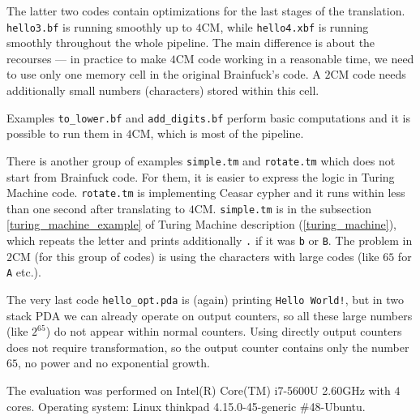 \documentclass[english,shortabstract,mgr]{iithesis}
\begin{document}
The latter two codes contain optimizations for the last stages of the translation. \texttt{hello3.bf}
is running smoothly up to $4$CM, while \texttt{hello4.xbf} is running smoothly
throughout the whole pipeline. The main difference is about the recourses ---
in practice to make $4$CM code working in a reasonable time, we need to use only
one memory cell in the original Brainfuck's code. A $2$CM code needs
additionally small numbers (characters) stored within this cell.

Examples \texttt{to\_lower.bf} and \texttt{add\_digits.bf} perform basic
computations and it is possible to run them in $4$CM, which is most of the pipeline.

There is another group of examples \texttt{simple.tm} and \texttt{rotate.tm}
which does not start from Brainfuck code. For them, it is easier to express
the logic in Turing Machine code. \texttt{rotate.tm} is implementing Ceasar cypher
and it runs within less than one second after translating to $4$CM. \texttt{simple.tm}
is in the subsection \ref{turing_machine_example} of Turing Machine
description (\ref{turing_machine}), which repeats the letter and prints
additionally \texttt{.} if it was \texttt{b} or \texttt{B}.
The problem in $2$CM (for this group of codes) is using the characters with
large codes (like $65$ for \texttt{A} etc.).

The very last code \texttt{hello\_opt.pda} is (again) printing
\texttt{Hello World!}, but in two stack PDA we can already operate on
output counters, so all these large numbers (like $2^{65}$) do not
appear within normal counters. Using directly output counters does not
require transformation, so the output counter contains only the number $65$,
no power and no exponential growth.


The evaluation was performed on Intel(R) Core(TM) i7-5600U 2.60GHz
with $4$ cores. Operating system: Linux thinkpad 4.15.0-45-generic \#48-Ubuntu.
\end{document}
